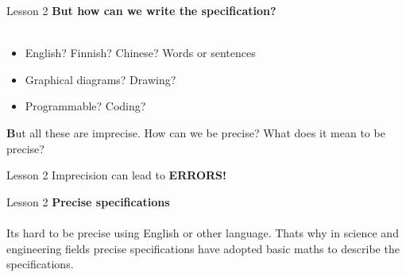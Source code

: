 \documentclass[aspectratio=1610]{beamer}
\begin{document}
\begin{frame}{Lesson 2}{}
\LARGE
\textbf{But how can we write the specification?}\\~\\
\begin{itemize}
    \item English? Finnish? Chinese? Words or sentences
    \item Graphical diagrams? Drawing?
    \item Programmable? Coding?
\end{itemize}

\Large
\textbf But all these are imprecise. How can we be precise? What does it mean to be precise?
\end{frame}


\begin{frame}{Lesson 2}{}
\Huge
	Imprecision can lead to \alert{\textbf{ERRORS!}}
\end{frame}


\begin{frame}{Lesson 2}{}
\LARGE
\textbf{Precise specifications}\\~\\
Its hard to be precise using English or other language. Thats why in science and 
engineering fields precise specifications have adopted basic maths to describe 
the specifications.
\end{frame}
\end{document}
